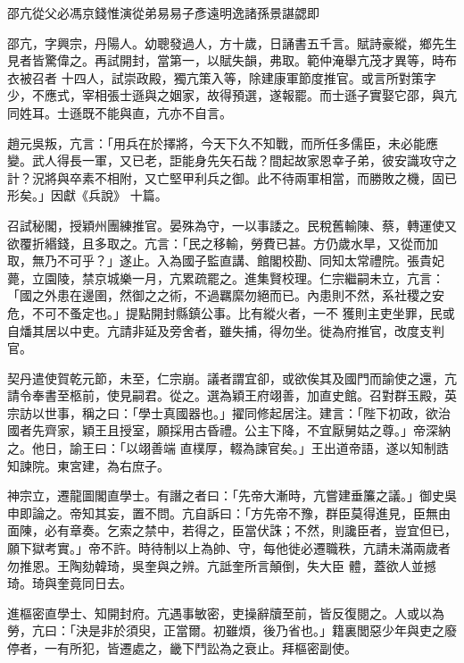 
\begin{pinyinscope}

 邵亢從父必馮京錢惟演從弟易易子彥遠明逸諸孫景諶勰即



 邵亢，字興宗，丹陽人。幼聰發過人，方十歲，日誦書五千言。賦詩豪縱，鄉先生見者皆驚偉之。再試開封，當第一，以賦失韻，弗取。範仲淹舉亢茂才異等，時布衣被召者
 十四人，試崇政殿，獨亢策入等，除建康軍節度推官。或言所對策字少，不應式，宰相張士遜與之姻家，故得預選，遂報罷。而士遜子實娶它邵，與亢同姓耳。士遜既不能與直，亢亦不自言。



 趙元吳叛，亢言：「用兵在於擇將，今天下久不知戰，而所任多儒臣，未必能應變。武人得長一軍，又已老，詎能身先矢石哉？間起故家恩幸子弟，彼安識攻守之計？況將與卒素不相附，又亡堅甲利兵之御。此不待兩軍相當，而勝敗之機，固已形矣。」因獻《兵說》
 十篇。



 召試秘閣，授穎州團練推官。晏殊為守，一以事諉之。民稅舊輸陳、蔡，轉運使又欲覆折緡錢，且多取之。亢言：「民之移輸，勞費已甚。方仍歲水旱，又從而加取，無乃不可乎？」遂止。入為國子監直講、館閣校勘、同知太常禮院。張貴妃薨，立園陵，禁京城樂一月，亢累疏罷之。進集賢校理。仁宗繼嗣未立，亢言：「國之外患在邊圉，然御之之術，不過羈縻勿絕而已。內患則不然，系社稷之安危，不可不蚤定也。」提點開封縣鎮公事。比有縱火者，一不
 獲則主吏坐罪，民或自燔其居以中吏。亢請非延及旁舍者，雖失捕，得勿坐。徙為府推官，改度支判官。



 契丹遣使賀乾元節，未至，仁宗崩。議者謂宜卻，或欲俟其及國門而諭使之還，亢請令奉書至柩前，使見嗣君。從之。選為穎王府翊善，加直史館。召對群玉殿，英宗訪以世事，稱之曰：「學士真國器也。」擢同修起居注。建言：「陛下初政，欲治國者先齊家，穎王且授室，願採用古昏禮。公主下降，不宜厭舅姑之尊。」帝深納之。他日，諭王曰：「以翊善端
 直樸厚，輟為諫官矣。」王出道帝語，遂以知制誥知諫院。東宮建，為右庶子。



 神宗立，遷龍圖閣直學士。有譖之者曰：「先帝大漸時，亢嘗建垂簾之議。」御史吳申即論之。帝知其妄，置不問。亢自訴曰：「方先帝不豫，群臣莫得進見，臣無由面陳，必有章奏。乞索之禁中，若得之，臣當伏誅；不然，則讒臣者，豈宜但已，願下獄考實。」帝不許。時待制以上為帥、守，每他徙必遷職秩，亢請未滿兩歲者勿推恩。王陶劾韓琦，吳奎與之辨。亢詆奎所言顛倒，失大臣
 體，蓋欲人並撼琦。琦與奎竟同日去。



 進樞密直學士、知開封府。亢遇事敏密，吏操辭牘至前，皆反復閱之。人或以為勞，亢曰：「決是非於須臾，正當爾。初雖煩，後乃省也。」籍裏閭惡少年與吏之廢停者，一有所犯，皆遷處之，畿下鬥訟為之衰止。拜樞密副使。




\end{pinyinscope}
